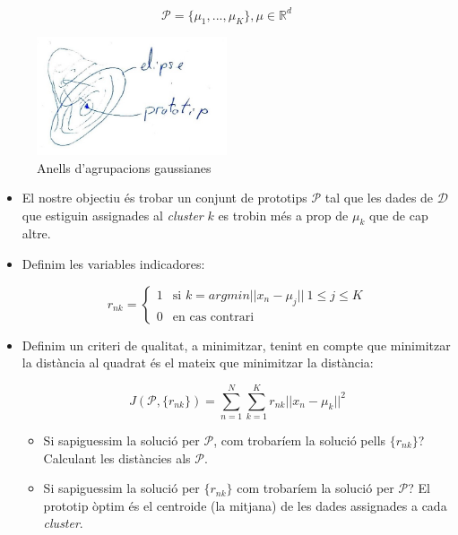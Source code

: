 $$ \mathcal{P} = \{ \mu_1, ..., \mu_K \}, \mu \in \mathbb{R}^d $$

\begin{figure}[H]
    \centering
    \includegraphics[width=0.5\textwidth]{tema_3/images/figura_4}
    \caption{Anells d'agrupacions gaussianes}
\end{figure}

\begin{itemize}
	\item El nostre objectiu és trobar un conjunt de prototips $\mathcal{P}$ tal que les dades de $\mathcal{D}$ que estiguin assignades al \emph{cluster} $k$ es trobin més a prop de $\mu_k$ que de cap altre.
	\item Definim les variables indicadores:
	
	$$ 
	r_{nk} =
	\begin{cases}
	1 & \text{si } k = argmin ||x_n - \mu_j||\ 1 \le j \le K \\ 0 & \text{en cas contrari}
	\end{cases}
	$$
	
	\item Definim un criteri de qualitat, a minimitzar, tenint en compte que minimitzar la distància al quadrat és el mateix que minimitzar la distància:
	
	$$ J(\mathcal{P}, \{r_{nk}\}) = \sum_{n=1}^N \sum_{k=1}^K r_{nk} ||x_n - \mu_k||^2 $$
	
	\begin{itemize}
		\item Si sapiguessim la solució per $\mathcal{P}$, com trobaríem la solució pells $\{r_{nk}\}$? Calculant les distàncies als $\mathcal{P}$.
		
		\item Si sapiguessim la solució per $\{r_{nk}\}$ com trobaríem la solució per $\mathcal{P}$? El prototip òptim és el centroide (la mitjana) de les dades assignades a cada \emph{cluster}.
	\end{itemize}
\end{itemize}


